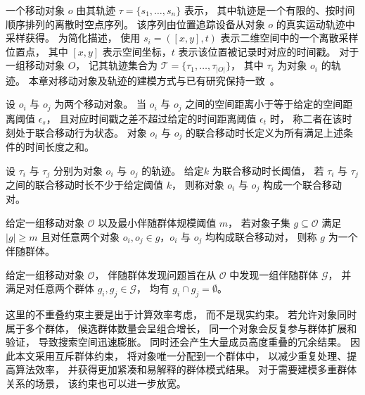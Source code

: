 \begin{definition}[移动对象及其轨迹]
一个移动对象 $o$ 由其轨迹 $\tau=\{s_1,\ldots,s_n\}$ 表示， 其中轨迹是一个有限的、按时间顺序排列的离散时空点序列。 该序列由位置追踪设备从对象 $o$ 的真实运动轨迹中采样获得。 为简化描述， 使用 $s_i=([x,y],t)$ 表示二维空间中的一个离散采样位置点， 其中 $[x,y]$ 表示空间坐标，$t$ 表示该位置被记录时对应的时间戳。 对于一组移动对象 $O$， 记其轨迹集合为 $\mathcal{T}=\{\tau_1,\ldots,\tau_{|O|}\}$， 其中 $\tau_i$ 为对象 $o_i$ 的轨迹。 本章对移动对象及轨迹的建模方式与已有研究保持一致~。
\end{definition}

\begin{definition}[联合移动时长]
设 $o_i$ 与 $o_j$ 为两个移动对象。 当 $o_i$ 与 $o_j$ 之间的空间距离小于等于给定的空间距离阈值 $\epsilon_s$， 且对应时间戳之差不超过给定的时间距离阈值 $\epsilon_t$ 时， 称二者在该时刻处于联合移动行为状态。 对象 $o_i$ 与 $o_j$ 的联合移动时长定义为所有满足上述条件的时间长度之和。
\end{definition}

\begin{definition}[联合移动对]
设 $\tau_i$ 与 $\tau_j$ 分别为对象 $o_i$ 与 $o_j$ 的轨迹。 给定$k$ 为联合移动时长阈值， 若 $\tau_i$ 与 $\tau_j$ 之间的联合移动时长不少于给定阈值 $k$， 则称对象 $o_i$ 与 $o_j$ 构成一个联合移动对。
\end{definition}

\begin{definition}[伴随群体]
给定一组移动对象 $\mathcal{O}$ 以及最小伴随群体规模阈值 $m$， 若对象子集 $g\subseteq \mathcal{O}$ 满足$|g|\geq m$ 且对任意两个对象 $o_i,o_j\in g$，$o_i$ 与 $o_j$ 均构成联合移动对， 则称 $g$ 为一个伴随群体。
\end{definition}

\begin{definition}[伴随群体发现问题]
给定一组移动对象 $\mathcal{O}$， 伴随群体发现问题旨在从 $\mathcal{O}$ 中发现一组伴随群体 $\mathcal{G}$， 并满足对任意两个群体 $g_i, g_j\in\mathcal{G}$， 均有 $g_i\cap g_j=\emptyset$。
\end{definition}

这里的不重叠约束主要是出于计算效率考虑， 而不是现实约束。 若允许对象同时属于多个群体， 候选群体数量会呈组合增长， 同一个对象会反复参与群体扩展和验证， 导致搜索空间迅速膨胀。 同时还会产生大量成员高度重叠的冗余结果。 因此本文采用互斥群体约束， 将对象唯一分配到一个群体中， 以减少重复处理、提高算法效率， 并获得更加紧凑和易解释的群体模式结果。 对于需要建模多重群体关系的场景， 该约束也可以进一步放宽。

